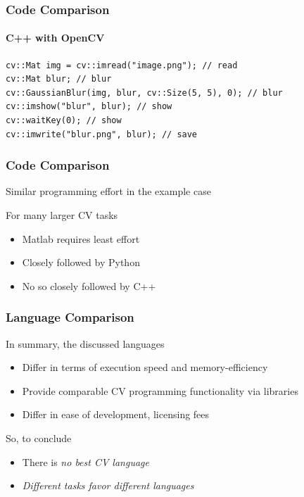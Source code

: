 \documentclass[xetex,professionalfont]{beamer}
\begin{document}

\begin{frame}[fragile]
\frametitle{Code Comparison}
\framesubtitle{C++ with OpenCV}

\begin{verbatim}
cv::Mat img = cv::imread("image.png"); // read
cv::Mat blur; // blur
cv::GaussianBlur(img, blur, cv::Size(5, 5), 0); // blur
cv::imshow("blur", blur); // show
cv::waitKey(0); // show
cv::imwrite("blur.png", blur); // save
\end{verbatim}

\end{frame}


\begin{frame}
\frametitle{Code Comparison}

Similar programming effort in the example case

\bigskip
For many larger CV tasks
\begin{itemize}
	\item Matlab requires least effort
	\item Closely followed by Python
	\item No so closely followed by C++
\end{itemize}

\end{frame}


\begin{frame}
\frametitle{Language Comparison}

In summary, the discussed languages
\begin{itemize}
	\item Differ in terms of execution speed and memory-efficiency
	\item Provide comparable CV programming functionality via libraries
	\item Differ in ease of development, licensing fees
\end{itemize}

\bigskip
So, to conclude
\begin{itemize}
	\item There is \emph{no best CV language}
	\item \emph{Different tasks favor different languages}
\end{itemize}

\end{frame}
\end{document}
